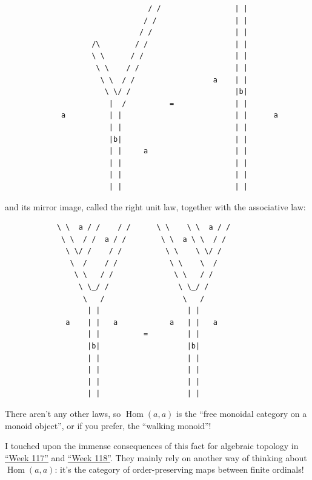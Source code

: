 \documentclass{article}
\begin{document}
\begin{verbatim}
                                 / /                 | |
                                / /                  | |
                               / /                   | |
                    /\        / /                    | |
                    \ \      / /                     | |
                     \ \    / /                      | |
                      \ \  / /                  a    | |
                       \ \/ /                        |b|
                        |  /          =              | |
             a          | |                          | |      a
                        | |                          | |
                        |b|                          | |
                        | |     a                    | |
                        | |                          | |
                        | |                          | |
                        | |                          | |
\end{verbatim}

and its mirror image, called the right unit law, together with the
associative law:

\begin{verbatim}
            \ \  a / /    / /      \ \    \ \  a / /
             \ \  / /  a / /        \ \  a \ \  / /
              \ \/ /    / /          \ \    \ \/ /
               \  /    / /            \ \    \  /
                \ \   / /              \ \   / /
                 \ \_/ /                \ \_/ /
                  \   /                  \   /
                   | |                    | |
              a    | |   a            a   | |   a
                   | |          =         | |
                   |b|                    |b|
                   | |                    | |
                   | |                    | |
                   | |                    | |
                   | |                    | |
\end{verbatim}

There aren't any other laws, so \(\operatorname{Hom}(a,a)\) is the
``free monoidal category on a monoid object'', or if you prefer, the
``walking monoid''!

I touched upon the immense consequences of this fact for algebraic
topology in \protect\hyperlink{week117}{``Week 117''} and
\protect\hyperlink{week118}{``Week 118''}. They mainly rely on another
way of thinking about \(\operatorname{Hom}(a,a)\): it's the category of
order-preserving maps between finite ordinals!
\end{document}
